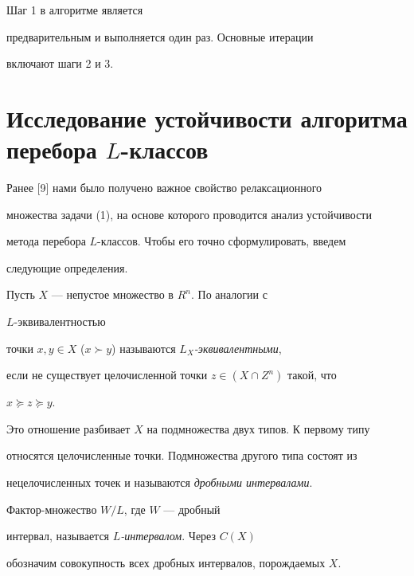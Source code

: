 \pagebreak





Шаг 1 в алгоритме  является


предварительным и выполняется один раз. Основные итерации


включают шаги 2 и 3.








\section{Исследование устойчивости алгоритма перебора $L$-классов}








Ранее [9] нами было получено важное свойство релаксационного


множества задачи (1), на основе которого проводится анализ устойчивости


метода перебора $L$-классов. Чтобы его точно сформулировать, введем


следующие определения.








Пусть $X$ --- непустое множество в $R^{n}$. По аналогии с 


$L$-эквивалентностью


точки $x,y \in X$ ($x \succ y$) называются {\it $L_{X}$-эквивалентными},


если не существует целочисленной точки $z \in (X \cap Z^{n})$ такой, что


$x \succeq z \succeq y$.


Это отношение разбивает $X$ на подмножества двух типов. К первому типу


относятся целочисленные точки. Подмножества другого типа состоят из 


нецелочисленных точек и называются { \it дробными интервалами}.


Фактор-множество $W/L$, где $W$ --- дробный 


интервал, называется { \it $L$-интервалом}. Через $C(X)$ 


обозначим совокупность всех дробных интервалов, порождаемых $X$.








